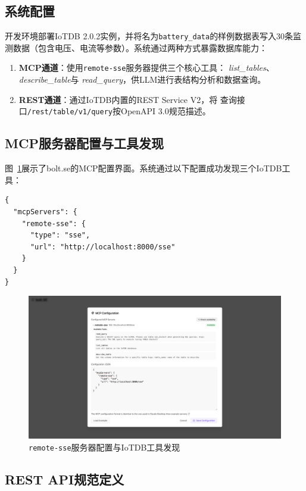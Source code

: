\subsection{系统配置}

开发环境部署IoTDB 2.0.2实例，并将名为\texttt{battery\_data}的样例数据表写入30条监测数据（包含电压、电流等参数）。系统通过两种方式暴露数据库能力：

\begin{enumerate}
  \item \textbf{MCP通道}：使用\texttt{remote-sse}服务器提供三个核心工具：
        \textit{list\_tables}、\textit{describe\_table}与
        \textit{read\_query}，供LLM进行表结构分析和数据查询。
  \item \textbf{REST通道}：通过IoTDB内置的REST Service V2，将
        查询接口\texttt{/rest/table/v1/query}按OpenAPI 3.0规范描述。
\end{enumerate}

\subsection{MCP服务器配置与工具发现}

图~\ref{fig:mcp-config}展示了bolt.se的MCP配置界面。系统通过以下配置成功发现三个IoTDB工具：

\begin{verbatim}
{
  "mcpServers": {
    "remote-sse": {
      "type": "sse",
      "url": "http://localhost:8000/sse"
    }
  }
}
\end{verbatim}

\begin{figure}[htbp]
  \centering
  \includegraphics[width=.7\textwidth]{figures/screenshots/iotdb-demo/mcp-config.png}
  \caption{\texttt{remote-sse}服务器配置与IoTDB工具发现}
  \label{fig:mcp-config}
\end{figure}

\subsection{REST API规范定义}

